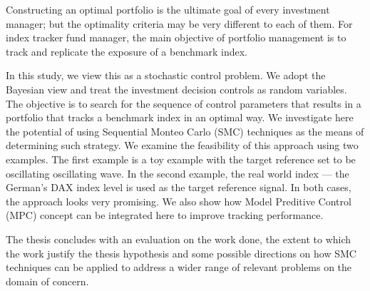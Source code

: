 


\begin{abstracts}        %
  Constructing an optimal portfolio is the ultimate goal of every investment manager; but the optimality criteria may be very different to each of them. For index tracker fund manager, the main objective of portfolio management is to track and replicate the exposure of a benchmark index.

In this study, we view this as a stochastic control problem. We adopt the Bayesian view and treat the investment decision controls as random variables. The objective is to search for the sequence of control parameters that results in a portfolio that tracks a benchmark index in an optimal way. We investigate here the potential of using Sequential Monteo Carlo (SMC) techniques as the means of determining such strategy. We examine the feasibility of this approach using two examples. The first example is a toy example with the target reference set to be oscillating oscillating wave. In the second example, the real world index --- the German's DAX index level is used as the target reference signal. In both cases, the approach looks very promising. We also show how Model Preditive Control (MPC) concept can be integrated here to improve tracking performance.

  The thesis concludes with an evaluation on the work done, the extent
  to which the work justify the thesis hypothesis and some possible
  directions on how SMC techniques can be applied to address
  a wider range of relevant problems on the domain of concern.
\end{abstracts}




